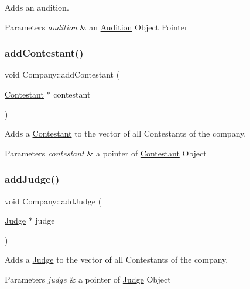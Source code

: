 Adds an audition. 


\begin{DoxyParams}{Parameters}
{\em audition} & an \hyperlink{class_audition}{Audition} Object Pointer \\
\hline
\end{DoxyParams}
\mbox{\label{class_company_a8db12922bdf5e3bc1817dd001ca81f7a}} 
\subsubsection{\texorpdfstring{add\+Contestant()}{addContestant()}}
{\footnotesize\ttfamily void Company\+::add\+Contestant (\begin{DoxyParamCaption}\item[{\hyperlink{class_contestant}{Contestant} $\ast$}]{contestant }\end{DoxyParamCaption})}



Adds a \hyperlink{class_contestant}{Contestant} to the vector of all Contestants of the company. 


\begin{DoxyParams}{Parameters}
{\em contestant} & a pointer of \hyperlink{class_contestant}{Contestant} Object \\
\hline
\end{DoxyParams}
\mbox{\label{class_company_a349e0b6205c7dfe137e50cd35666448e}} 
\subsubsection{\texorpdfstring{add\+Judge()}{addJudge()}}
{\footnotesize\ttfamily void Company\+::add\+Judge (\begin{DoxyParamCaption}\item[{\hyperlink{class_judge}{Judge} $\ast$}]{judge }\end{DoxyParamCaption})}



Adds a \hyperlink{class_judge}{Judge} to the vector of all Contestants of the company. 


\begin{DoxyParams}{Parameters}
{\em judge} & a pointer of \hyperlink{class_judge}{Judge} Object \\
\hline
\end{DoxyParams}
\mbox{\label{class_company_a6784ebb8b31be1fcb5a1e5665b84c06c}} 

